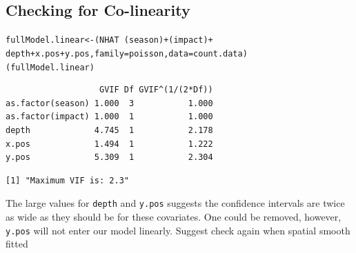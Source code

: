 \subsection{Checking for Co-linearity}
\begin{frame}[fragile]
\begin{knitrout}\footnotesize
{}\color{fgcolor}\begin{kframe}
\begin{alltt}
fullModel.linear <- (NHAT ~ (season) + (impact) + 
    depth + x.pos + y.pos, family = poisson, data =count.data)
(fullModel.linear)
\end{alltt}
\begin{verbatim}
                   GVIF Df GVIF^(1/(2*Df))
as.factor(season) 1.000  3           1.000
as.factor(impact) 1.000  1           1.000
depth             4.745  1           2.178
x.pos             1.494  1           1.222
y.pos             5.309  1           2.304
\end{verbatim}
\end{kframe}
\end{knitrout}

\begin{knitrout}\footnotesize
{}\color{fgcolor}\begin{kframe}
\begin{verbatim}
[1] "Maximum VIF is: 2.3"
\end{verbatim}
\end{kframe}
\end{knitrout}
\begin{block}{}
The large values for {\tt depth} and {\tt y.pos} suggests the confidence intervals are twice as wide as they should be for these covariates. One could be removed, however, {\tt y.pos} will not enter our model linearly.  Suggest check again when spatial smooth fitted
\end{block}
\end{frame}

